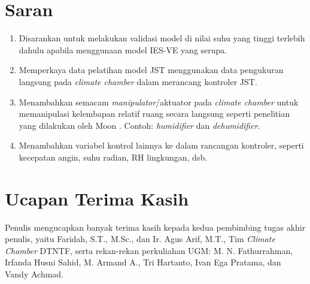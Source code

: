 \documentclass[a4paper,10pt]{article}
\newenvironment{body}{\begin{multicols}{2}}{\end{multicols}}
\begin{document}
\begin{body}
		\section{Saran}
		\begin{enumerate}
			\item Disarankan untuk melakukan validasi model di nilai suhu yang tinggi terlebih dahulu apabila menggunaan model IES-VE yang serupa.
			\item Memperkaya data pelatihan model JST menggunakan data pengukuran langsung pada \textit{climate chamber} dalam merancang kontroler JST.
			\item Menambahkan semacam \textit{manipulator}/aktuator pada \textit{climate chamber} untuk memanipulasi kelembapan relatif ruang secara langsung seperti penelitian yang dilakukan oleh Moon \cite{paper22JJkim}. Contoh: \textit{humidifier} dan \textit{dehumidifier}.
			\item Menambahkan variabel kontrol lainnya ke dalam rancangan kontroler, seperti kecepatan angin, suhu radian, RH lingkungan, dsb.
		\end{enumerate}
		\vspace{2mm}
		
		\section*{Ucapan Terima Kasih}
		Penulis mengucapkan banyak terima kasih kepada kedua pembimbing tugas akhir penulis, yaitu Faridah, S.T., M.Sc., dan Ir. Agus Arif, M.T., Tim \textit{Climate Chamber} DTNTF, serta rekan-rekan perkuliahan UGM: M. N. Fathurrahman, Irfanda Husni Sahid, M. Armand A., Tri Hartanto, Ivan Ega Pratama, dan Vandy Achmad.
		
		
		
	\end{body}
\end{document}
